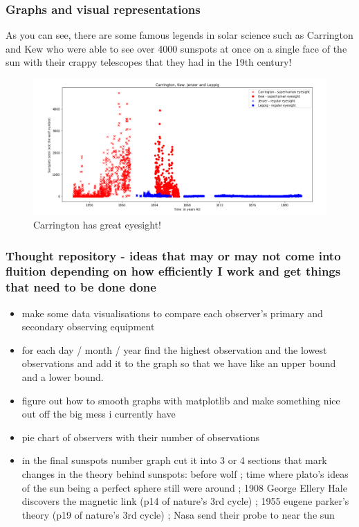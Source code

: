 \documentclass[12pt]{article}
\begin{document}
\newpage{}

\subsubsection{Graphs and visual representations}

As you can see, there are some famous legends in solar science such as Carrington and Kew who were able to see over 4000 sunspots at once on a single face of the sun with their crappy telescopes that they had in the 19th century!
\begin{figure}
  \includegraphics[width=\linewidth]{CarringtonHasGoodEyesight.png}
  \caption{Carrington has great eyesight!}
  \label{fig:boat1}
\end{figure}

\subsubsection{Thought repository - ideas that may or may not come into fluition depending on how efficiently I work and get things that need to be done done}
\begin{itemize}
    \item make some data visualisations to compare each observer's primary and secondary observing equipment
    \item for each day / month / year find the highest observation and the lowest observations and add it to the graph so that we have like an upper bound and a lower bound. 
    \item figure out how to smooth graphs with matplotlib and make something nice out off the big mess i currently have
    \item pie chart of observers with their number of observations
    \item in the final sunspots number graph cut it into 3 or 4 sections that mark changes in the theory behind sunspots: before wolf ; time where plato's ideas of the sun being a perfect sphere still were around ; 1908 George Ellery Hale discovers the magnetic link (p14 of nature's 3rd cycle) ; 1955 eugene parker's theory (p19 of nature's 3rd cycle) ; Nasa send their probe to near the sun
\end{itemize}
\end{document}
